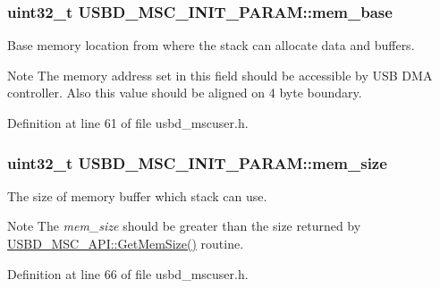 \subsubsection[{\texorpdfstring{mem\+\_\+base}{mem_base}}]{\setlength{\rightskip}{0pt plus 5cm}uint32\+\_\+t U\+S\+B\+D\+\_\+\+M\+S\+C\+\_\+\+I\+N\+I\+T\+\_\+\+P\+A\+R\+A\+M\+::mem\+\_\+base}\hypertarget{structUSBD__MSC__INIT__PARAM_a1ab6b66d44ad7db8c2ded5e2f4200aae}{}\label{structUSBD__MSC__INIT__PARAM_a1ab6b66d44ad7db8c2ded5e2f4200aae}
Base memory location from where the stack can allocate data and buffers. \begin{DoxyNote}{Note}
The memory address set in this field should be accessible by U\+SB D\+MA controller. Also this value should be aligned on 4 byte boundary. 
\end{DoxyNote}


Definition at line 61 of file usbd\+\_\+mscuser.\+h.

\subsubsection[{\texorpdfstring{mem\+\_\+size}{mem_size}}]{\setlength{\rightskip}{0pt plus 5cm}uint32\+\_\+t U\+S\+B\+D\+\_\+\+M\+S\+C\+\_\+\+I\+N\+I\+T\+\_\+\+P\+A\+R\+A\+M\+::mem\+\_\+size}\hypertarget{structUSBD__MSC__INIT__PARAM_a33048544944f306ae198de18468309b4}{}\label{structUSBD__MSC__INIT__PARAM_a33048544944f306ae198de18468309b4}
The size of memory buffer which stack can use. \begin{DoxyNote}{Note}
The {\itshape mem\+\_\+size} should be greater than the size returned by \hyperlink{structUSBD__MSC__API_a73a9d240b20fcd83e6d2c9675420d626}{U\+S\+B\+D\+\_\+\+M\+S\+C\+\_\+\+A\+P\+I\+::\+Get\+Mem\+Size()} routine. 
\end{DoxyNote}


Definition at line 66 of file usbd\+\_\+mscuser.\+h.

